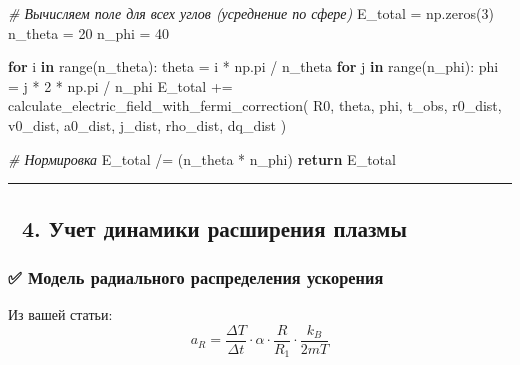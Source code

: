 \documentclass[11pt]{article}
\newenvironment{Shaded}{}{}
\newcommand{\KeywordTok}[1]{\textcolor[rgb]{0.00,0.44,0.13}{\textbf{{#1}}}}
\newcommand{\DecValTok}[1]{\textcolor[rgb]{0.25,0.63,0.44}{{#1}}}
\newcommand{\CommentTok}[1]{\textcolor[rgb]{0.38,0.63,0.69}{\textit{{#1}}}}
\newcommand{\NormalTok}[1]{{#1}}
\newcommand{\ControlFlowTok}[1]{\textcolor[rgb]{0.00,0.44,0.13}{\textbf{{#1}}}}
\newcommand{\OperatorTok}[1]{\textcolor[rgb]{0.40,0.40,0.40}{{#1}}}
\newcommand{\BuiltInTok}[1]{{#1}}
\begin{document}
\begin{Shaded}
\begin{Highlighting}[]
    \CommentTok{# Вычисляем поле для всех углов (усреднение по сфере)}
\NormalTok{    E_total }\OperatorTok{=}\NormalTok{ np.zeros(}\DecValTok{3}\NormalTok{)}
\NormalTok{    n_theta }\OperatorTok{=} \DecValTok{20}
\NormalTok{    n_phi }\OperatorTok{=} \DecValTok{40}

    \ControlFlowTok{for}\NormalTok{ i }\KeywordTok{in} \BuiltInTok{range}\NormalTok{(n_theta):}
\NormalTok{        theta }\OperatorTok{=}\NormalTok{ i }\OperatorTok{*}\NormalTok{ np.pi }\OperatorTok{/}\NormalTok{ n_theta}
        \ControlFlowTok{for}\NormalTok{ j }\KeywordTok{in} \BuiltInTok{range}\NormalTok{(n_phi):}
\NormalTok{            phi }\OperatorTok{=}\NormalTok{ j }\OperatorTok{*} \DecValTok{2} \OperatorTok{*}\NormalTok{ np.pi }\OperatorTok{/}\NormalTok{ n_phi}
\NormalTok{            E_total }\OperatorTok{+=}\NormalTok{ calculate_electric_field_with_fermi_correction(}
\NormalTok{                R0, theta, phi, t_obs, }
\NormalTok{                r0_dist, v0_dist, a0_dist, j_dist,}
\NormalTok{                rho_dist, dq_dist}
\NormalTok{            )}

    \CommentTok{# Нормировка}
\NormalTok{    E_total }\OperatorTok{/=}\NormalTok{ (n_theta }\OperatorTok{*}\NormalTok{ n_phi)}
    \ControlFlowTok{return}\NormalTok{ E_total}
\end{Highlighting}
\end{Shaded}

\begin{center}\rule{0.5\linewidth}{\linethickness}\end{center}

\subsection{🔹 4. Учет динамики расширения
плазмы}\label{ux443ux447ux435ux442-ux434ux438ux43dux430ux43cux438ux43aux438-ux440ux430ux441ux448ux438ux440ux435ux43dux438ux44f-ux43fux43bux430ux437ux43cux44b}

\subsubsection{✅ Модель радиального распределения
ускорения}\label{ux43cux43eux434ux435ux43bux44c-ux440ux430ux434ux438ux430ux43bux44cux43dux43eux433ux43e-ux440ux430ux441ux43fux440ux435ux434ux435ux43bux435ux43dux438ux44f-ux443ux441ux43aux43eux440ux435ux43dux438ux44f}

Из вашей статьи: \[
a_R = \frac{\Delta T}{\Delta t} \cdot \alpha \cdot \frac{R}{R_1} \cdot \frac{k_B}{2mT}
\]
\end{document}

